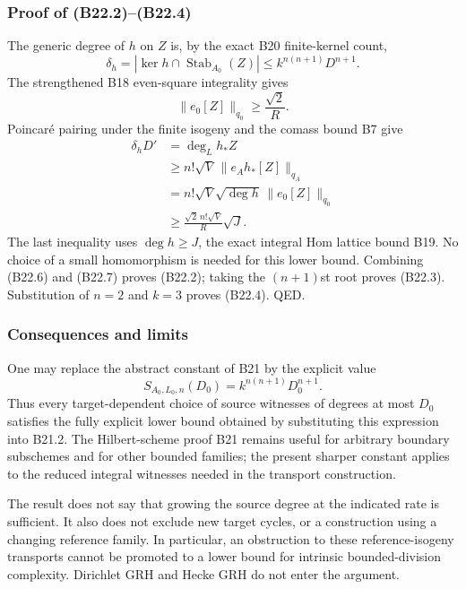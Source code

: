 \documentclass[11pt,a4paper]{article}
\theoremstyle{definition}
\begin{document}
\subsubsection{Proof of (B22.2)--(B22.4)}\label{proof-of-b22.2b22.4}

The generic degree of \(h\) on \(Z\) is, by the exact B20 finite-kernel count, \[
 \delta_h=|\ker h\cap\operatorname{Stab}_{A_0}(Z)|
 \le k^{n(n+1)}D^{n+1}.
\tag{B22.6}
\] The strengthened B18 even-square integrality gives \[
 \|e_0[Z]\|_{q_0}\ge\frac{\sqrt2}{R}.
\] Poincaré pairing under the finite isogeny and the comass bound B7 give \[
 \begin{aligned}
 \delta_hD'
 &=\deg_Lh_*Z\\
 &\ge n!\sqrt V\,\|e_Ah_*[Z]\|_{q_A}\\
 &=n!\sqrt V\sqrt{\deg h}\,\|e_0[Z]\|_{q_0}\\
 &\ge\frac{\sqrt2\,n!\sqrt V}{R}\sqrt J.
 \end{aligned}
\tag{B22.7}
\] The last inequality uses \(\deg h\ge J\), the exact integral Hom lattice bound B19. No choice of a small homomorphism is needed for this lower bound. Combining (B22.6) and (B22.7) proves (B22.2); taking the \((n+1)\)st root proves (B22.3). Substitution of \(n=2\) and \(k=3\) proves (B22.4). QED.

\subsubsection{Consequences and limits}\label{consequences-and-limits}

One may replace the abstract constant of B21 by the explicit value \[
 S_{A_0,L_0,n}(D_0)=k^{n(n+1)}D_0^{n+1}.
\] Thus every target-dependent choice of source witnesses of degrees at most \(D_0\) satisfies the fully explicit lower bound obtained by substituting this expression into B21.2. The Hilbert-scheme proof B21 remains useful for arbitrary boundary subschemes and for other bounded families; the present sharper constant applies to the reduced integral witnesses needed in the transport construction.

The result does not say that growing the source degree at the indicated rate is sufficient. It also does not exclude new target cycles, or a construction using a changing reference family. In particular, an obstruction to these reference-isogeny transports cannot be promoted to a lower bound for intrinsic bounded-division complexity. Dirichlet GRH and Hecke GRH do not enter the argument.
\end{document}
